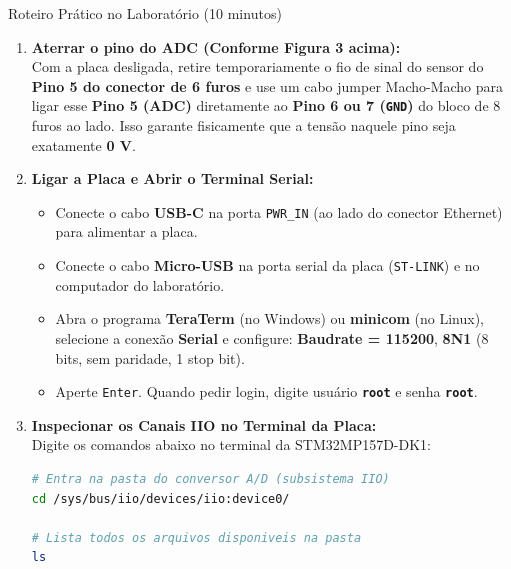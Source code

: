 \documentclass[11pt,a4paper]{article}
\begin{document}
\begin{labbox}{Roteiro Prático no Laboratório (10 minutos)}
\begin{enumerate}[leftmargin=*]
    \item \textbf{Aterrar o pino do ADC (Conforme Figura 3 acima):} \\
    Com a placa desligada, retire temporariamente o fio de sinal do sensor do \textbf{Pino 5 do conector de 6 furos} e use um cabo jumper Macho-Macho para ligar esse \textbf{Pino 5 (ADC)} diretamente ao \textbf{Pino 6 ou 7 (\texttt{GND})} do bloco de 8 furos ao lado. Isso garante fisicamente que a tensão naquele pino seja exatamente \textbf{0 V}.
    
    \item \textbf{Ligar a Placa e Abrir o Terminal Serial:}
    \begin{itemize}
        \item Conecte o cabo \textbf{USB-C} na porta \texttt{PWR\_IN} (ao lado do conector Ethernet) para alimentar a placa.
        \item Conecte o cabo \textbf{Micro-USB} na porta serial da placa (\texttt{ST-LINK}) e no computador do laboratório.
        \item Abra o programa \textbf{TeraTerm} (no Windows) ou \textbf{minicom} (no Linux), selecione a conexão \textbf{Serial} e configure: \textbf{Baudrate = 115200}, \textbf{8N1} (8 bits, sem paridade, 1 stop bit).
        \item Aperte \texttt{Enter}. Quando pedir login, digite usuário \textbf{\texttt{root}} e senha \textbf{\texttt{root}}.
    \end{itemize}
    
    \item \textbf{Inspecionar os Canais IIO no Terminal da Placa:} \\
    Digite os comandos abaixo no terminal da STM32MP157D-DK1:
\begin{lstlisting}[language=bash]
# Entra na pasta do conversor A/D (subsistema IIO)
cd /sys/bus/iio/devices/iio:device0/

# Lista todos os arquivos disponiveis na pasta
ls


\end{lstlisting}
\end{enumerate}
\end{labbox}
\end{document}

